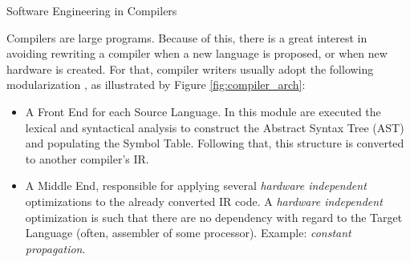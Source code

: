 \begin{section}{Software Engineering in Compilers}\label{sec:engineering}





Compilers are large programs. Because of this, there is a great interest in
avoiding rewriting a compiler when a new language is proposed, or when new
hardware is created. For that, compiler writers usually adopt the following
modularization \citep{redhat} \citep{llvm}, as illustrated by Figure
\ref{fig:compiler_arch}:

%

\begin{itemize}

\item A Front End for each Source Language. In this module are executed the
lexical and syntactical analysis to construct the Abstract Syntax Tree (AST)
and populating the Symbol Table. Following that, this structure is converted to
another compiler's IR.

\item A Middle End, responsible for applying several \textit{hardware independent}
optimizations to the already converted IR code. A \textit{hardware independent}
optimization is such that there are no dependency with regard to the Target
Language (often, assembler of some processor). Example: \textit{constant propagation}.


\end{itemize}
\end{section}
